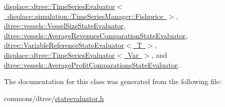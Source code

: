 \mbox{\hyperlink{classdisplace_1_1dtree_1_1_time_series_evaluator_3_01displace_1_1simulation_1_1_time_series_manager_1_1_fishprice_01_4_aeb9f91b082019b408710115c5121aadf}{displace\+::dtree\+::\+Time\+Series\+Evaluator$<$ displace\+::simulation\+::\+Time\+Series\+Manager\+::\+Fishprice $>$}}, \mbox{\hyperlink{classdtree_1_1vessels_1_1_vessel_size_state_evaluator_af698d80a67d26f0184b0f83454905bb4}{dtree\+::vessels\+::\+Vessel\+Size\+State\+Evaluator}}, \mbox{\hyperlink{classdtree_1_1vessels_1_1_average_revenues_comparation_state_evaluator_a6c1e969c3e60c9a30858cc20378c0b48}{dtree\+::vessels\+::\+Average\+Revenues\+Comparation\+State\+Evaluator}}, \mbox{\hyperlink{classdtree_1_1_variable_reference_state_evaluator_a94e2383713ab366e325b9c55dd694463}{dtree\+::\+Variable\+Reference\+State\+Evaluator$<$ T $>$}}, \mbox{\hyperlink{classdisplace_1_1dtree_1_1_time_series_evaluator_aca42c6a8684a9bc24d335817d6742f84}{displace\+::dtree\+::\+Time\+Series\+Evaluator$<$ Var $>$}}, and \mbox{\hyperlink{classdtree_1_1vessels_1_1_average_profit_comparations_state_evaluator_adede06c45d79b7aeebf4c5173168ce3b}{dtree\+::vessels\+::\+Average\+Profit\+Comparations\+State\+Evaluator}}.



The documentation for this class was generated from the following file\+:\begin{DoxyCompactItemize}
\item 
commons/dtree/\mbox{\hyperlink{stateevaluator_8h}{stateevaluator.\+h}}\end{DoxyCompactItemize}
